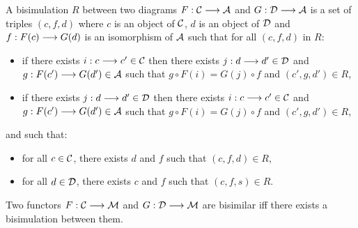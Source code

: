\begin{defi}
\label{def:alternatedefbisim}
A bisimulation $R$ between two diagrams $F : \mathcal{C} \longrightarrow \mathcal{A}$ and $G : \mathcal{D} \longrightarrow \mathcal{A}$ is a set of triples $(c,f,d)$ where $c$ is an object of $\mathcal{C}$, $d$ is an object of $\mathcal{D}$ and $f : F(c) \longrightarrow G(d)$ is an isomorphism of $\mathcal{A}$ such that for all $(c,f,d)$ in $R$:
\begin{itemize}
	\item if there exists $i : c \longrightarrow c' \in \mathcal{C}$ then there exists $j : d \longrightarrow d' \in \mathcal{D}$ and $g : F(c') \longrightarrow G(d') \in \mathcal{A}$ such that $g\circ F(i) = G(j) \circ f$ and $(c',g,d') \in R$,
	
		\begin{figure}[H]
			\begin{center}
    				
  			\end{center}
		\end{figure}
	
	\item if there exists $j : d \longrightarrow d'\in \mathcal{D}$ then there exists $i : c \longrightarrow c' \in \mathcal{C}$ and $g : F(c') \longrightarrow G(d') \in \mathcal{A}$ such that $g\circ F(i) = G(j) \circ f$ and $(c',g,d') \in R$,
	
		\begin{figure}[H]
			\begin{center}
    				
  			\end{center}
		\end{figure}
	
\end{itemize}
and such that:
\begin{itemize}
	\item for all $c\in\mathcal{C}$, there exists $d$ and $f$ such that $(c,f,d)\in R$,
	\item for all $d\in\mathcal{D}$, there exists $c$ and $f$ such that $(c,f,s)\in R$.
\end{itemize}
\end{defi}

\begin{prop} Two functors $F : \mathcal{C} \longrightarrow \mathcal{M}$ and $G : \mathcal{D} \longrightarrow \mathcal{M}$ 
are bisimilar iff there exists a bisimulation between them.\end{prop}

